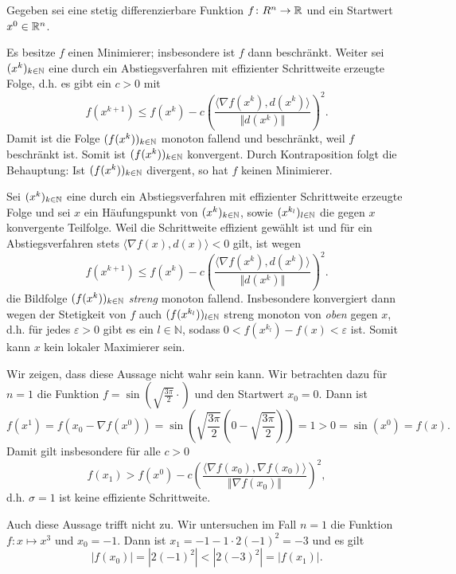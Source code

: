 
Gegeben sei eine stetig differenzierbare Funktion $f\colon R^n\to \mathbb{R}$
und ein Startwert $x^0\in\mathbb{R}^n$.\\
\begin{compactenum}[(i)]
 \item Es besitze $f$ einen Minimierer; insbesondere ist $f$ dann beschränkt.
 Weiter sei $(x^k)_{k\in\mathbb{N}}$ eine durch ein Abstiegsverfahren mit effizienter
 Schrittweite erzeugte Folge, d.h. es gibt ein $c>0$ mit
\begin{displaymath}
 f(x^{k+1})\leq f(x^k)-c\left(\frac{\langle\nabla f(x^k),d(x^k)\rangle}{\Vert d(x^k)\Vert}\right)^2.
\end{displaymath}
 Damit ist die Folge $(f(x^k))_{k\in\mathbb{N}}$ monoton fallend und beschränkt, weil
 $f$ beschränkt ist. Somit ist $(f(x^k))_{k\in\mathbb{N}}$ konvergent. Durch Kontraposition
 folgt die Behauptung: Ist $(f(x^k))_{k\in\mathbb{N}}$ divergent, so hat $f$ keinen Minimierer.
 \\
 \item Sei $(x^k)_{k\in\mathbb{N}}$ eine durch ein Abstiegsverfahren mit effizienter Schrittweite erzeugte
 Folge und sei $x$ ein Häufungspunkt von $(x^k)_{k\in\mathbb{N}}$, sowie $(x^{k_l})_{l\in\mathbb{N}}$ die gegen $x$ konvergente
 Teilfolge. Weil die Schrittweite effizient gewählt ist und für ein Abstiegsverfahren
  stets $\langle\nabla f(x),d(x)\rangle<0$ gilt, ist wegen
 \begin{displaymath}
 f(x^{k+1})\leq f(x^k)-c\left(\frac{\langle\nabla f(x^k),d(x^k)\rangle}{\Vert d(x^k)\Vert}\right)^2.
\end{displaymath}
 die Bildfolge $(f(x^k))_{k\in\mathbb{N}}$ \textit{streng} monoton fallend. Insbesondere konvergiert dann wegen der Stetigkeit von $f$
 auch $(f(x^{k_l}))_{l\in\mathbb{N}}$ streng monoton von \textit{oben} gegen $x$, d.h. für jedes $\varepsilon >0$ gibt es ein
 $l\in\mathbb{N}$, sodass $0<f(x^{k_l})-f(x)<\varepsilon$ ist. Somit kann $x$ kein lokaler Maximierer sein.
 \\
 \item Wir zeigen, dass diese Aussage nicht wahr sein kann. Wir betrachten dazu für $n=1$
 die Funktion $f=\sin(\sqrt{\frac{3\pi}{2}}\cdot)$ und den Startwert $x_0=0$. Dann ist
 \begin{displaymath}
  f(x^1)=f(x_0-\nabla f(x^0))=\sin\left(\sqrt{\frac{3\pi}{2}}\left(0-\sqrt{\frac{3\pi}{2}}\right)\right)=1>0=\sin(x^0)=f(x).
 \end{displaymath}
 Damit gilt insbesondere für alle $c>0$
 \begin{displaymath}
 f(x_1)> f(x^0)-c\left(\frac{\langle\nabla f(x_0),\nabla f(x_0)\rangle}{\Vert \nabla f(x_0)\Vert}\right)^2,
\end{displaymath}
d.h. $\sigma=1$ ist keine effiziente Schrittweite.
\\
 \item Auch diese Aussage trifft nicht zu. Wir untersuchen im Fall $n=1$ die Funktion $f\colon x\mapsto x^3$ und $x_0=-1$.
 Dann ist $x_1=-1-1\cdot 2(-1)^2=-3$ und es gilt
 \begin{displaymath}
  |f(x_0)|=|2(-1)^2|<|2(-3)^2|=|f(x_1)|.
 \end{displaymath}

\end{compactenum}
